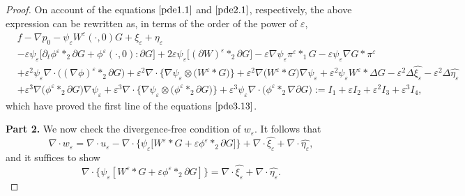 \documentclass[13pt,CJK]{article}
\theoremstyle{plain}                       %
\theoremstyle{remark}
\numberwithin{equation}{section}
\begin{document}
\begin{proof}
On account of the equations $\eqref{pde1.1}$ and $\eqref{pde2.1}$, respectively,
the above expression can be rewritten as, in terms of the order of the power of $\varepsilon$,
\begin{equation*}
\begin{aligned}
&f-\nabla p_0-\psi_{\varepsilon}W^{\varepsilon}(\cdot,0)G
+\xi_{\varepsilon}+\eta_{\varepsilon}\\
&-\varepsilon\psi_{\varepsilon}
\bigg[
\partial_t\phi^{\varepsilon}\ast_2\partial G+
\phi^{\varepsilon}(\cdot,0):\partial G
\bigg]+2\varepsilon\psi_{\varepsilon}\big[(\partial W)^{\varepsilon}\ast_2\partial G\big]
-\varepsilon
\nabla\psi_{\varepsilon}
\pi^{\varepsilon}\ast_1 G
-\varepsilon\psi_{\varepsilon}\nabla G\ast\pi^{\varepsilon}\\
&+\varepsilon^2\psi_{\varepsilon}
\nabla\cdot
\Big(
(\nabla\phi)^{\varepsilon}\ast_{2}\partial G
\Big)
+\varepsilon^2\nabla\cdot
\bigg\{
\nabla\psi_{\varepsilon}\otimes \big(W^{\varepsilon}\ast G\big)
\bigg\}
+\varepsilon^2\nabla\big(W^{\varepsilon}\ast G\big)\nabla
\psi_{\varepsilon}
+\varepsilon^2
\psi_{\varepsilon} W^{\varepsilon}\ast\Delta G
-\varepsilon^2
\Delta\hat{\xi_{\varepsilon}}-\varepsilon^2\Delta\hat{\eta_{\varepsilon}}\\
&+\varepsilon^3\nabla
\big(\phi^{\varepsilon}\ast_2\partial G\big)\nabla\psi_{\varepsilon}+
\varepsilon^3\nabla\cdot\bigg\{
\nabla\psi_{\varepsilon}\otimes
\big(\phi^{\varepsilon}\ast_2\partial G\big)
\bigg\}
+\varepsilon^3\psi_{\varepsilon}
\nabla\cdot\Big(\phi^{\varepsilon}\ast_2\nabla\partial G\Big)
:=I_1+\varepsilon I_2+\varepsilon^2 I_3+\varepsilon^3 I_4,
\end{aligned}
\end{equation*}
which have proved the first line of the equations $\eqref{pde3.13}$.

\medskip

\textbf{Part 2.} We now check the divergence-free condition of $w_{\varepsilon}$.
It follows that
\begin{equation*}
\nabla\cdot w_{\varepsilon}=\nabla\cdot u_{\varepsilon}-\nabla\cdot
\bigg\{
\psi_{\varepsilon}\big[W^{\varepsilon}\ast G+\varepsilon\phi^{\varepsilon}
\ast_2 \partial G\big]
\bigg\}
+\nabla\cdot\hat{\xi_{\varepsilon}}+\nabla\cdot\hat{\eta_{\varepsilon}},
\end{equation*}
and it suffices to show
\begin{equation}\label{f:4.6}
\nabla\cdot \bigg\{
\psi_{\varepsilon}[W^{\varepsilon}\ast G+\varepsilon\phi^{\varepsilon}\ast_2 \partial G]
\bigg\} = \nabla\cdot\hat{\xi_{\varepsilon}} + \nabla\cdot\hat{\eta_{\varepsilon}}.
\end{equation}


\end{proof}
\end{document}
